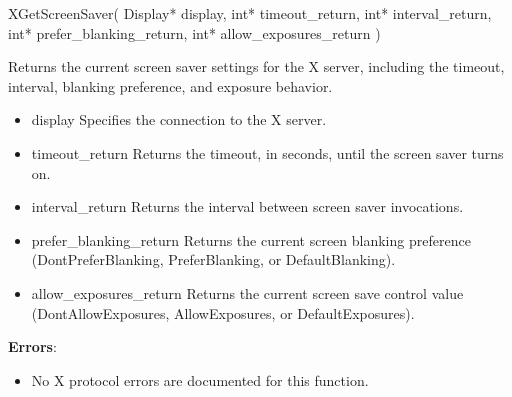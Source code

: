 \documentclass{report}
\begin{document}
\begin{itemize}
        \begin{cppcode}
            XGetScreenSaver(
                Display* display,
                int* timeout_return,
                int* interval_return,
                int* prefer_blanking_return,
                int* allow_exposures_return
            )
        \end{cppcode}
        \bigbreak \noindent
        Returns the current screen saver settings for the X server, including the timeout, interval, blanking preference, and exposure behavior.
        \begin{itemize}
            \item display Specifies the connection to the X server.
            \item timeout\_return Returns the timeout, in seconds, until the screen saver turns on.
            \item interval\_return Returns the interval between screen saver invocations.
            \item prefer\_blanking\_return Returns the current screen blanking preference (DontPreferBlanking, PreferBlanking, or DefaultBlanking).
            \item allow\_exposures\_return Returns the current screen save control value (DontAllowExposures, AllowExposures, or DefaultExposures).
        \end{itemize}
        \bigbreak \noindent
        \textbf{Errors}:
        \begin{itemize}
            \item No X protocol errors are documented for this function.
        \end{itemize}

    \end{itemize}
    \pagebreak 
\end{document}
